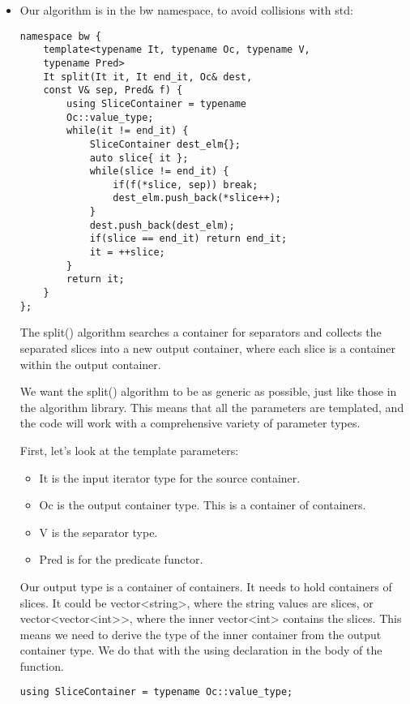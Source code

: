 \begin{itemize}
\item 
Our algorithm is in the bw namespace, to avoid collisions with std:

\begin{lstlisting}[style=styleCXX]
namespace bw {
	template<typename It, typename Oc, typename V,
	typename Pred>
	It split(It it, It end_it, Oc& dest,
	const V& sep, Pred& f) {
		using SliceContainer = typename
		Oc::value_type;
		while(it != end_it) {
			SliceContainer dest_elm{};
			auto slice{ it };
			while(slice != end_it) {
				if(f(*slice, sep)) break;
				dest_elm.push_back(*slice++);
			}
			dest.push_back(dest_elm);
			if(slice == end_it) return end_it;
			it = ++slice;
		}
		return it;
	}
};
\end{lstlisting}

The split() algorithm searches a container for separators and collects the separated slices into a new output container, where each slice is a container within the output container.

We want the split() algorithm to be as generic as possible, just like those in the algorithm library. This means that all the parameters are templated, and the code will work with a comprehensive variety of parameter types.

First, let's look at the template parameters:

\begin{itemize}
\item 
It is the input iterator type for the source container.

\item 
Oc is the output container type. This is a container of containers.

\item 
V is the separator type.

\item 
Pred is for the predicate functor.
\end{itemize}

Our output type is a container of containers. It needs to hold containers of slices. It could be vector<string>, where the string values are slices, or vector<vector<int>{}>, where the inner vector<int> contains the slices. This means we need to derive the type of the inner container from the output container type. We do that with the using declaration in the body of the function.

\begin{lstlisting}[style=styleCXX]
using SliceContainer = typename Oc::value_type;
\end{lstlisting}


\end{itemize}
